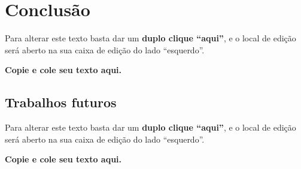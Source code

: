 \chapter[Conclusão]{Conclusão}
Para alterar este texto basta dar um 
\textbf{duplo clique “aqui”}, e o local de edição será aberto na sua caixa de edição do lado “esquerdo”.

\textbf{Copie e cole seu texto aqui.}


\section{Trabalhos futuros}

Para alterar este texto basta dar um 
\textbf{duplo clique “aqui”}, e o local de edição será aberto na sua caixa de edição do lado “esquerdo”.

\textbf{Copie e cole seu texto aqui.}